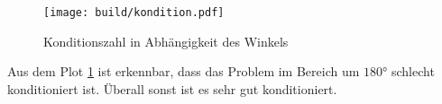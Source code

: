 \begin{figure}
  \centering
  \texttt{[image: build/kondition.pdf]}
  \caption{Konditionszahl in Abhängigkeit des Winkels}
  \label{fig:kondition}
\end{figure}
\noindent Aus dem Plot \ref{fig:kondition} ist erkennbar, dass das Problem im Bereich um $180\si{\degree}$ schlecht konditioniert ist.
Überall sonst ist es sehr gut konditioniert.





